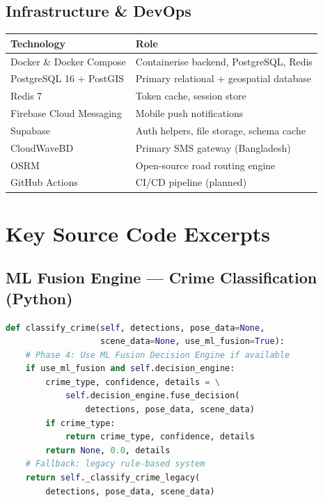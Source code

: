 \documentclass[12pt,a4paper]{report}
\begin{document}
\subsection{Infrastructure \& DevOps}

\begin{longtable}{@{}p{4.5cm}p{9cm}@{}}
\toprule
\textbf{Technology} & \textbf{Role} \\
\midrule
\endhead
Docker \& Docker Compose & Containerise backend, PostgreSQL, Redis \\
PostgreSQL 16 + PostGIS & Primary relational + geospatial database \\
Redis 7 & Token cache, session store \\
Firebase Cloud Messaging & Mobile push notifications \\
Supabase & Auth helpers, file storage, schema cache \\
CloudWaveBD & Primary SMS gateway (Bangladesh) \\
OSRM & Open-source road routing engine \\
GitHub Actions & CI/CD pipeline (planned) \\
\bottomrule
\end{longtable}

\section{Key Source Code Excerpts}

\subsection{ML Fusion Engine — Crime Classification (Python)}
\begin{lstlisting}[language=Python, caption={Crime classification with weighted multi-model voting (crime\_vision\_service.py)}]
def classify_crime(self, detections, pose_data=None,
                   scene_data=None, use_ml_fusion=True):
    # Phase 4: Use ML Fusion Decision Engine if available
    if use_ml_fusion and self.decision_engine:
        crime_type, confidence, details = \
            self.decision_engine.fuse_decision(
                detections, pose_data, scene_data)
        if crime_type:
            return crime_type, confidence, details
        return None, 0.0, details
    # Fallback: legacy rule-based system
    return self._classify_crime_legacy(
        detections, pose_data, scene_data)
\end{lstlisting}
\end{document}
